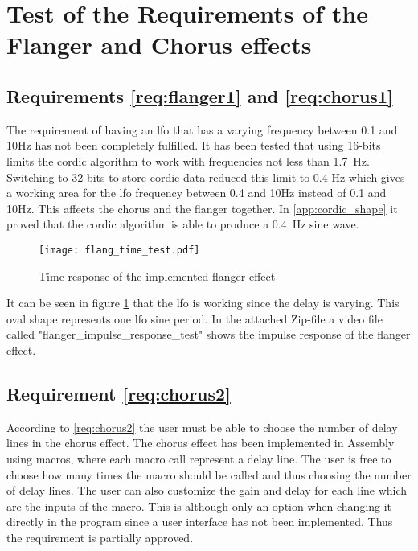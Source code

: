 \newpage
\section{Test of the Requirements of the Flanger and Chorus effects}

\subsection{Requirements \ref{req:flanger1} and \ref{req:chorus1}}

The requirement of having an \gls{lfo} that has a varying frequency between 0.1 and 10Hz has not been completely fulfilled. It has been tested that using 16-bits limits the \gls{cordic} algorithm to work with frequencies not less than \SI{1.7}{\hertz}. Switching to 32 bits to store \gls{cordic} data reduced this limit to 0.4 Hz which gives a working area for the \gls{lfo} frequency between 0.4 and 10Hz instead of 0.1 and 10Hz. This affects the chorus and the flanger together. In \autoref{app:cordic_shape} it proved that the \gls{cordic} algorithm is able to produce a \SI{0.4}{\hertz} sine wave.

\begin{figure}[hbt]
	\centering
  \texttt{[image: flang\_time\_test.pdf]}
  \caption{Time response of the implemented flanger effect}
  \label{fig:flang_time_test}
\end{figure}

It can be seen in figure \ref{fig:flang_time_test} that the \gls{lfo} is working since the delay is varying. This oval shape represents one \gls{lfo} sine period. In the attached Zip-file a video file called "flanger_impulse_response_test" shows the impulse response of the flanger effect.



\subsection{Requirement \ref{req:chorus2}}

According to \autoref{req:chorus2} the user must be able to choose the number of delay lines in the chorus effect. The chorus effect has been implemented in Assembly using macros, where each macro call represent a delay line. The user is free to choose how many times the macro should be called and thus choosing the number of delay lines. The user can also customize the gain and delay for each line which are the inputs of the macro. This is although only an option when changing it directly in the program since a user interface has not been implemented. Thus the requirement is partially approved.

